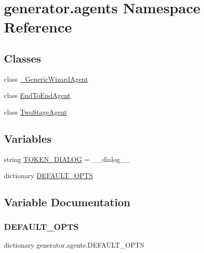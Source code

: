 \hypertarget{namespacegenerator_1_1agents}{}\section{generator.\+agents Namespace Reference}
\label{namespacegenerator_1_1agents}
\subsection*{Classes}
\begin{DoxyCompactItemize}
\item 
class \hyperlink{classgenerator_1_1agents_1_1__GenericWizardAgent}{\+\_\+\+Generic\+Wizard\+Agent}
\item 
class \hyperlink{classgenerator_1_1agents_1_1EndToEndAgent}{End\+To\+End\+Agent}
\item 
class \hyperlink{classgenerator_1_1agents_1_1TwoStageAgent}{Two\+Stage\+Agent}
\end{DoxyCompactItemize}
\subsection*{Variables}
\begin{DoxyCompactItemize}
\item 
string \hyperlink{namespacegenerator_1_1agents_a2570342ffe252995531fe5570e32a9ea}{T\+O\+K\+E\+N\+\_\+\+D\+I\+A\+L\+OG} = \textquotesingle{}\+\_\+\+\_\+dialog\+\_\+\+\_\+\textquotesingle{}
\item 
dictionary \hyperlink{namespacegenerator_1_1agents_aa4f8ee89ab0dc63c5ebbebd732cfb793}{D\+E\+F\+A\+U\+L\+T\+\_\+\+O\+P\+TS}
\end{DoxyCompactItemize}


\subsection{Variable Documentation}
\mbox{\label{namespacegenerator_1_1agents_aa4f8ee89ab0dc63c5ebbebd732cfb793}} 
\subsubsection{\texorpdfstring{D\+E\+F\+A\+U\+L\+T\+\_\+\+O\+P\+TS}{DEFAULT\_OPTS}}
{\footnotesize\ttfamily dictionary generator.\+agents.\+D\+E\+F\+A\+U\+L\+T\+\_\+\+O\+P\+TS}

